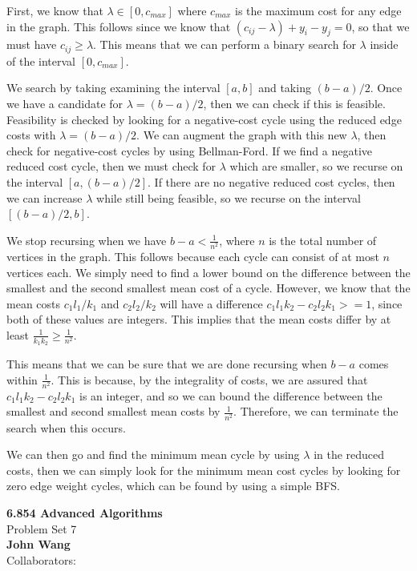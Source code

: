 \documentclass[psamsfonts]{amsart}
\newenvironment{sol}{\vspace{0.25cm}{\large \bfseries Solution:}}{\qedsymbol}
\newcommand{\makenewtitle}{
    \begin{center}
    {\huge \bfseries 6.854 Advanced Algorithms} \\
    Problem Set 7\\
    \vspace{0.25cm}
    {\bfseries John Wang} \\
    Collaborators: 
    \end{center}
    \vspace{0.5cm}
}
\begin{document}
\begin{sol}
First, we know that $\lambda \in [0, c_{max}]$ where $c_{max}$ is the maximum cost for any edge in the graph. This follows since we know that $(c_{ij} - \lambda) + y_i - y_j = 0$, so that we must have $c_{ij} \geq \lambda$. This means that we can perform a binary search for $\lambda$ inside of the interval $[0, c_{max}]$. 

We search by taking examining the interval $[a,b]$ and taking $(b-a)/2$. Once we have a candidate for $\lambda = (b-a)/2$, then we can check if this is feasible. Feasibility is checked by looking for a negative-cost cycle using the reduced edge costs with $\lambda = (b-a)/2$. We can augment the graph with this new $\lambda$, then check for negative-cost cycles by using Bellman-Ford. If we find a negative reduced cost cycle, then we must check for $\lambda$ which are smaller, so we recurse on the interval $[a, (b-a)/2]$. If there are no negative reduced cost cycles, then we can increase $\lambda$ while still being feasible, so we recurse on the interval $[(b-a)/2, b]$. 

We stop recursing when we have $b - a < \frac{1}{n^2}$, where $n$ is the total number of vertices in the graph. This follows because each cycle can consist of at most $n$ vertices each. We simply need to find a lower bound on the difference between the smallest and the second smallest mean cost of a cycle. However, we know that the mean costs $c_1 l_1 / k_1$ and $c_2 l_2 / k_2$ will have a difference $c_1 l_1 k_2 - c_2 l_2 k_1 >= 1$, since both of these values are integers. This implies that the mean costs differ by at least $\frac{1}{k_1 k_2} \geq \frac{1}{n^2}$. 

This means that we can be sure that we are done recursing when $b-a$ comes within $\frac{1}{n^2}$. This is because, by the integrality of costs, we are assured that $c_1 l_1 k_2 - c_2 l_2 k_1$ is an integer, and so we can bound the difference between the smallest and second smallest mean costs by $\frac{1}{n^2}$. Therefore, we can terminate the search when this occurs. 

We can then go and find the minimum mean cycle by using $\lambda$ in the reduced costs, then we can simply look for the minimum mean cost cycles by looking for zero edge weight cycles, which can be found by using a simple BFS.
\end{sol}

\newpage
\makenewtitle
\end{document}
